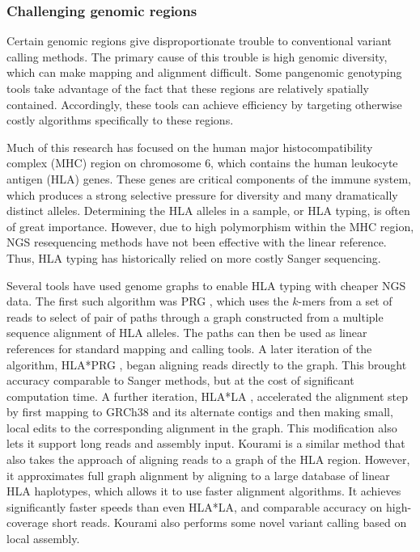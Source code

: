 \subsubsection{Challenging genomic regions}

Certain genomic regions give disproportionate trouble to conventional variant calling methods. 
The primary cause of this trouble is high genomic diversity, which can make mapping and alignment difficult. 
Some pangenomic genotyping tools take advantage of the fact that these regions are relatively spatially contained. 
Accordingly, these tools can achieve efficiency by targeting otherwise costly algorithms specifically to these regions.

Much of this research has focused on the human major histocompatibility complex (MHC) region on chromosome 6, which contains the human leukocyte antigen (HLA) genes. 
These genes are critical components of the immune system, which produces a strong selective pressure for diversity and many dramatically distinct alleles.
Determining the HLA alleles in a sample, or HLA typing, is often of great importance. 
However, due to high polymorphism within the MHC region, NGS resequencing methods have not been effective with the linear reference.
Thus, HLA typing has historically relied on more costly Sanger sequencing.

Several tools have used genome graphs to enable HLA typing with cheaper NGS data.
The first such algorithm was PRG \cite{dilthey2015improved}, which uses the $k$-mers from a set of reads to select of pair of paths through a graph constructed from a multiple sequence alignment of HLA alleles.
The paths can then be used as linear references for standard mapping and calling tools.
A later iteration of the algorithm, HLA*PRG \cite{dilthey2018hla}, began aligning reads directly to the graph.
This brought accuracy comparable to Sanger methods, but at the cost of significant computation time.
A further iteration, HLA*LA \cite{dilthey2019hla}, accelerated the alignment step by first mapping to GRCh38 and its alternate contigs and then making small, local edits to the corresponding alignment in the graph.
This modification also lets it support long reads and assembly input.
Kourami \cite{lee2018kourami} is a similar method that also takes the approach of aligning reads to a graph of the HLA region.
However, it approximates full graph alignment by aligning to a large database of linear HLA haplotypes, which allows it to use faster alignment algorithms.
It achieves significantly faster speeds than even HLA*LA, and comparable accuracy on high-coverage short reads.
Kourami also performs some novel variant calling based on local assembly.


